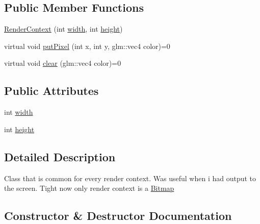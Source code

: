 \subsection*{Public Member Functions}
\begin{DoxyCompactItemize}
\item 
\hyperlink{class_render_context_aff0b414b1aa39e7c5ca4ed5cadf20721}{Render\+Context} (int \hyperlink{class_render_context_a8009663c022d4a60d8a4dbfdb4183f46}{width}, int \hyperlink{class_render_context_a194a36ce3d85ae9ef5b40396e1e2d950}{height})
\item 
virtual void \hyperlink{class_render_context_a722f7e593dc2c480ad5a2a448196c2dc}{put\+Pixel} (int x, int y, glm\+::vec4 color)=0
\item 
virtual void \hyperlink{class_render_context_a9c6a34962ba769bacbb054ea435dfce8}{clear} (glm\+::vec4 color)=0
\end{DoxyCompactItemize}
\subsection*{Public Attributes}
\begin{DoxyCompactItemize}
\item 
int \hyperlink{class_render_context_a8009663c022d4a60d8a4dbfdb4183f46}{width}
\item 
int \hyperlink{class_render_context_a194a36ce3d85ae9ef5b40396e1e2d950}{height}
\end{DoxyCompactItemize}


\subsection{Detailed Description}
Class that is common for every render context. Was useful when i had output to the screen. Tight now only render context is a \hyperlink{class_bitmap}{Bitmap} 

\subsection{Constructor \& Destructor Documentation}
\hypertarget{class_render_context_aff0b414b1aa39e7c5ca4ed5cadf20721}{}
